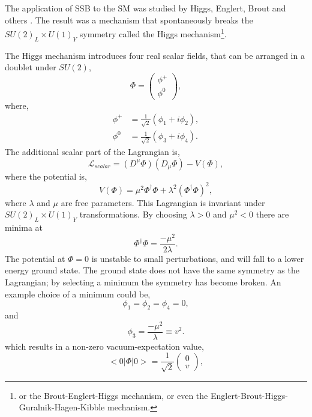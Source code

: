 The application of {SSB} to the {SM} was studied by Higgs, Englert, Brout
and others \cite{higgs1981broken, englert1964broken, guralnik1964global}.
The result was a mechanism that spontaneously breaks the
 $SU(2)_{L} \times U(1)_{Y}$ symmetry called the Higgs mechanism\footnote{or the
Brout-Englert-Higgs mechanism, or even the
Englert-Brout-Higgs-Guralnik-Hagen-Kibble mechanism.}.

The Higgs mechanism introduces four real scalar fields, that can be arranged in a
doublet under $SU(2)$,
\begin{equation}
\Phi = \left( \begin{matrix} \phi^{+} \\ \phi^{0} \end{matrix} \right),
\end{equation}
where,
\begin{align*}
\phi^{+} &=\frac{1}{\sqrt{2}} (\phi_{1} + i \phi_{2}),\\
\phi^{0} &=\frac{1}{\sqrt{2}} (\phi_{3} + i \phi_{4}).
\end{align*}
The additional scalar part of the Lagrangian is,
\begin{equation}
\mathcal{L}_{scalar} = 
\left(D^{\mu}\Phi\right) \left(D_{\mu}\Phi\right) - V(\Phi),
\end{equation}
where the potential is,
\begin{equation}
V(\Phi) = 
\mu^{2}\Phi^{\dagger}\Phi + 
\lambda^{2} \left( \Phi^{\dagger} \Phi \right)^{2},
\end{equation}
where $\lambda$ and $\mu$ are free parameters. This Lagrangian is invariant
under $SU(2)_{L} \times U(1)_{Y}$ transformations.
By choosing  $\lambda>0$ and
$\mu^{2}<0$ there are minima at
\begin{equation}
\Phi^{\dagger} \Phi = \frac{- \mu^{2}}{2 \lambda}.
\end{equation}
The potential at $\Phi=0$ is unstable to small perturbations, and will fall
to a lower energy ground state. 
The ground state does not have the same symmetry as the Lagrangian; by
selecting a minimum the symmetry has become broken. An example choice of a minimum
could be,
\begin{equation}
\phi_{1} = \phi_{2} = \phi_{4} = 0,
\end{equation}
and
\begin{equation}
\phi_{3} = \frac{-\mu^{2}}{\lambda} \equiv v^{2}.
\end{equation}
which results in a non-zero vacuum-expectation value,
\begin{equation}
<0|\Phi|0> = \frac{1}{\sqrt{2}}\left(\begin{matrix}0\\v\end{matrix}\right),
\end{equation}
